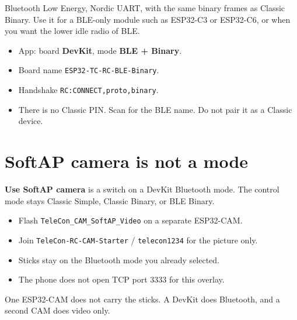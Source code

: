 \documentclass[12pt,a4paper]{article}
\newcommand{\code}[1]{\nolinkurl{#1}}
\newcommand{\ui}[1]{\textsf{\textbf{#1}}}
\begin{document}
Bluetooth Low Energy, Nordic UART, with the same binary frames as Classic
Binary. Use it for a BLE-only module such as ESP32-C3 or ESP32-C6, or when
you want the lower idle radio of BLE.

\begin{itemize}[leftmargin=1.4cm]
  \item App: board \ui{DevKit}, mode \ui{BLE + Binary}.
  \item Board name \code{ESP32-TC-RC-BLE-Binary}.
  \item Handshake \code{RC:CONNECT,proto,binary}.
  \item There is no Classic PIN. Scan for the BLE name. Do not pair it as
        a Classic device.
\end{itemize}

\section{SoftAP camera is not a mode}

\ui{Use SoftAP camera} is a switch on a DevKit Bluetooth mode. The control
mode stays Classic Simple, Classic Binary, or BLE Binary.

\begin{itemize}[leftmargin=1.4cm]
  \item Flash \code{TeleCon_CAM_SoftAP_Video} on a separate ESP32-CAM.
  \item Join \code{TeleCon-RC-CAM-Starter} / \code{telecon1234} for the
        picture only.
  \item Sticks stay on the Bluetooth mode you already selected.
  \item The phone does not open TCP port 3333 for this overlay.
\end{itemize}

One ESP32-CAM does not carry the sticks. A DevKit does Bluetooth, and a
second CAM does video only.
\end{document}
